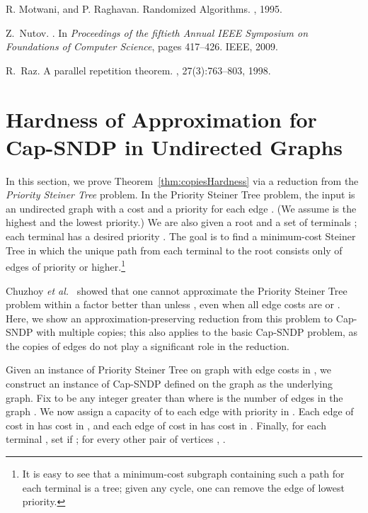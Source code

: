 \documentclass[11pt]{article}
\newcounter{thm0Rcopies}
\newcounter{thm_saved}
\newcommand{\etal}{{\em et al.}\ }
\begin{document}
\begin{thebibliography}{10}
R. Motwani, and P. Raghavan.
\newblock Randomized Algorithms.
, 1995.

Z.~Nutov.
.
\newblock In {\em Proceedings of the fiftieth Annual IEEE Symposium on
  Foundations of Computer Science}, pages 417--426. IEEE, 2009.



R.~Raz.
\newblock A parallel repetition theorem.
, 27(3):763--803, 1998.










\end{thebibliography}

\appendix

\section{Hardness of Approximation for  Cap-SNDP in Undirected Graphs}
\label{app:copiesHardness} 


In this section, we prove Theorem~\ref{thm:copiesHardness} via a
reduction from the \emph{Priority Steiner Tree} problem. In the
Priority Steiner Tree problem, the input is an undirected graph
 with a cost  and a priority 
for each edge . (We assume  is the highest and  the lowest
priority.) We are also given a root  and a set of terminals ; each terminal  has a desired priority
. The goal is to find a minimum-cost Steiner Tree in which the
unique path from each terminal  to the root consists only of edges
of priority  or higher.\footnote{It is easy to see that a
minimum-cost subgraph containing such a path for each terminal is a
tree; given any cycle, one can remove the edge of lowest priority.}

Chuzhoy \etal \cite{CGNS} showed that one cannot approximate the
Priority Steiner Tree problem within a factor better than  unless , even when
all edge costs are  or . Here, we show an
approximation-preserving reduction from this problem to Cap-SNDP with
multiple copies; this also applies to the basic Cap-SNDP problem, as
the copies of edges do not play a significant role in the
reduction. 

Given an instance  of Priority Steiner Tree on graph
 with edge costs in , we construct an instance
 of Cap-SNDP defined on the graph  as the
underlying graph.  Fix  to be any integer greater than  where
 is the number of edges in the graph .  We now assign a capacity
of  to each edge  with priority  in
. Each edge  of cost  in 
has cost  in , and each edge  of cost
 in  has cost  in
. Finally, for each terminal , set 
if ; for every other pair of vertices , .
\end{document}
